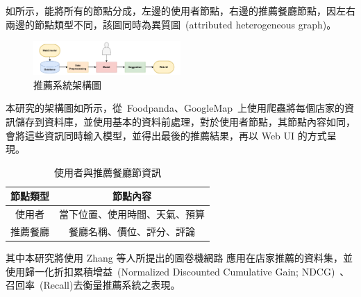 如所示，能將所有的節點分成，左邊的使用者節點，右邊的推薦餐廳節點，因左右兩邊的節點類型不同，該圖同時為異質圖~(attributed heterogeneous graph)。
\begin{figure}[tbh]
    \centering
    \includegraphics[width=0.5\textwidth]{img/flowg2.pdf}
    \caption{推薦系統架構圖}
    \label{fig-flowchart}
\end{figure}
本研究的架構圖如所示，從~Foodpanda、GoogleMap~上使用爬蟲將每個店家的資訊儲存到資料庫，並使用基本的資料前處理，對於使用者節點，其節點內容如同，會將這些資訊同時輸入模型，並得出最後的推薦結果，再以 Web UI 的方式呈現。
\begin{table}[htbp]
    \centering
    \renewcommand{\arraystretch}{1.15}
    \setlength{\tabcolsep}{7.5pt}
    \begin{tabular}{|c|c|}
    \hline
    \textbf{節點類型}   & \textbf{節點內容}                    \\ \hline
    使用者         & 當下位置、使用時間、天氣、預算          \\ \hline
    推薦餐廳      & 餐廳名稱、價位、評分、評論              \\ \hline
    \end{tabular}
    \caption{使用者與推薦餐廳節資訊}
    \label{node-conetent}
\end{table}
其中本研究將使用 Zhang 等人所提出的圖卷機網路 \cite{NIE-GCN} 應用在店家推薦的資料集，並使用歸一化折扣累積增益~(Normalized Discounted Cumulative Gain; NDCG)~、召回率~(Recall)去衡量推薦系統之表現。




    